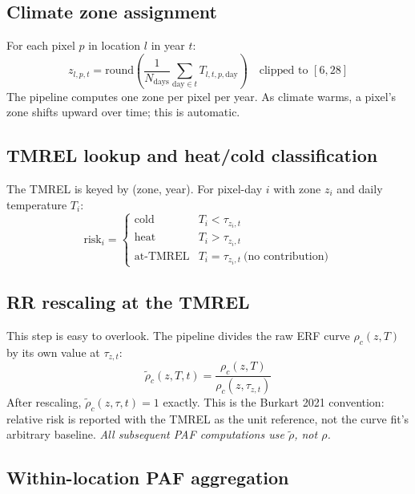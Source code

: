 \documentclass[11pt]{article}
\begin{document}
\subsection{Climate zone assignment}

For each pixel $p$ in location $l$ in year $t$:
\begin{equation}
z_{l,p,t} = \text{round}\!\left( \frac{1}{N_{\text{days}}} \sum_{\text{day} \in t} T_{l,t,p,\text{day}} \right)
\quad \text{clipped to } [6, 28]
\label{eq:zone}
\end{equation}
The pipeline computes one zone per pixel per year. As climate warms, a
pixel's zone shifts upward over time; this is automatic.

\subsection{TMREL lookup and heat/cold classification}

The TMREL is keyed by (zone, year). For pixel-day $i$ with zone
$z_i$ and daily temperature $T_i$:
\begin{equation}
\text{risk}_i = \begin{cases}
\text{cold} & T_i < \tau_{z_i, t} \\
\text{heat} & T_i > \tau_{z_i, t} \\
\text{at-TMREL} & T_i = \tau_{z_i, t}\ \text{(no contribution)}
\end{cases}
\end{equation}

\subsection{RR rescaling at the TMREL}

This step is easy to overlook. The pipeline divides the raw ERF curve
$\rho_c(z, T)$ by its own value at $\tau_{z,t}$:
\begin{equation}
\tilde\rho_c(z, T, t) = \frac{\rho_c(z, T)}{\rho_c(z, \tau_{z,t})}
\label{eq:rescale}
\end{equation}
After rescaling, $\tilde\rho_c(z, \tau, t) = 1$ exactly. This is the
Burkart 2021 convention: relative risk is reported with the TMREL as the
unit reference, not the curve fit's arbitrary baseline. \emph{All
subsequent PAF computations use $\tilde\rho$, not $\rho$.}

\subsection{Within-location PAF aggregation}
\end{document}
